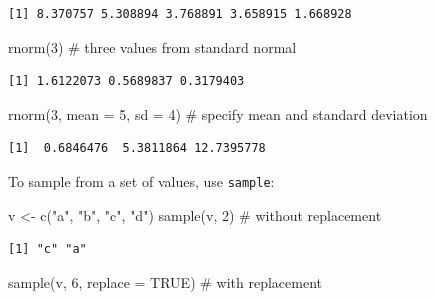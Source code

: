 \documentclass[
  letterpaper,
  DIV=11,
  numbers=noendperiod]{scrreprt}
\newenvironment{Shaded}{\begin{snugshade}}{\end{snugshade}}
\newcommand{\AttributeTok}[1]{\textcolor[rgb]{0.40,0.45,0.13}{#1}}
\newcommand{\CommentTok}[1]{\textcolor[rgb]{0.37,0.37,0.37}{#1}}
\newcommand{\ConstantTok}[1]{\textcolor[rgb]{0.56,0.35,0.01}{#1}}
\newcommand{\DecValTok}[1]{\textcolor[rgb]{0.68,0.00,0.00}{#1}}
\newcommand{\FunctionTok}[1]{\textcolor[rgb]{0.28,0.35,0.67}{#1}}
\newcommand{\NormalTok}[1]{\textcolor[rgb]{0.00,0.23,0.31}{#1}}
\newcommand{\OtherTok}[1]{\textcolor[rgb]{0.00,0.23,0.31}{#1}}
\newcommand{\StringTok}[1]{\textcolor[rgb]{0.13,0.47,0.30}{#1}}
\begin{document}
\begin{verbatim}
[1] 8.370757 5.308894 3.768891 3.658915 1.668928
\end{verbatim}

\begin{Shaded}
\begin{Highlighting}[]
\FunctionTok{rnorm}\NormalTok{(}\DecValTok{3}\NormalTok{) }\CommentTok{\# three values from standard normal}
\end{Highlighting}
\end{Shaded}

\begin{verbatim}
[1] 1.6122073 0.5689837 0.3179403
\end{verbatim}

\begin{Shaded}
\begin{Highlighting}[]
\FunctionTok{rnorm}\NormalTok{(}\DecValTok{3}\NormalTok{, }\AttributeTok{mean =} \DecValTok{5}\NormalTok{, }\AttributeTok{sd =} \DecValTok{4}\NormalTok{) }\CommentTok{\# specify mean and standard deviation}
\end{Highlighting}
\end{Shaded}

\begin{verbatim}
[1]  0.6846476  5.3811864 12.7395778
\end{verbatim}

To sample from a set of values, use \texttt{sample}:

\begin{Shaded}
\begin{Highlighting}[]
\NormalTok{v }\OtherTok{\textless{}{-}} \FunctionTok{c}\NormalTok{(}\StringTok{"a"}\NormalTok{, }\StringTok{"b"}\NormalTok{, }\StringTok{"c"}\NormalTok{, }\StringTok{"d"}\NormalTok{)}
\FunctionTok{sample}\NormalTok{(v, }\DecValTok{2}\NormalTok{) }\CommentTok{\# without replacement}
\end{Highlighting}
\end{Shaded}

\begin{verbatim}
[1] "c" "a"
\end{verbatim}

\begin{Shaded}
\begin{Highlighting}[]
\FunctionTok{sample}\NormalTok{(v, }\DecValTok{6}\NormalTok{, }\AttributeTok{replace =} \ConstantTok{TRUE}\NormalTok{) }\CommentTok{\# with replacement}
\end{Highlighting}
\end{Shaded}
\end{document}
